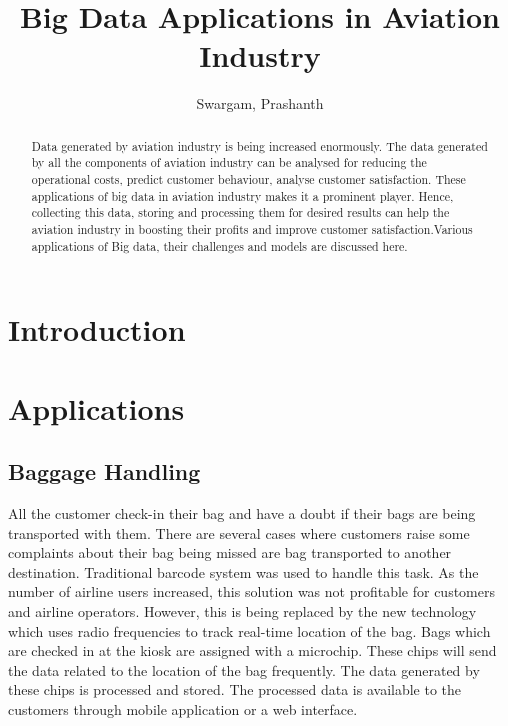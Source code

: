 \documentclass[sigconf]{acmart}
\begin{document}
\title{Big Data Applications in Aviation Industry}


\author{Swargam, Prashanth}


\renewcommand{\shortauthors}{B. Trovato et al.}


\begin{abstract}
Data generated by aviation industry is being increased enormously. The data generated by all the components of aviation industry can be analysed for reducing the operational costs, predict customer behaviour, analyse customer satisfaction. These applications of big data in aviation industry makes it a prominent player. Hence, collecting this data, storing and processing them for desired results can help the aviation industry in boosting their profits and improve customer satisfaction.Various applications of Big data, their challenges and models are discussed here.
\end{abstract}


\maketitle

\section{Introduction}



\section{Applications}

\subsection{Baggage Handling}

All the customer check-in their bag and have a doubt if their bags are being transported with them. There are several cases where customers raise some complaints about their bag being missed are bag transported to another destination. Traditional barcode system was used to handle this task. As the number of airline users increased, this solution was not profitable for customers and airline operators. However, this is being replaced by the new technology which uses radio frequencies to track real-time location of the bag. Bags which are checked in at the kiosk are assigned with a microchip. These chips will send the data related to the location of the bag frequently.  The data generated by these chips is processed and stored. The processed data is available to the customers through mobile application or a web interface.
\end{document}
